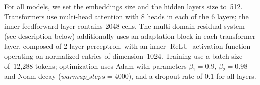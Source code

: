 \documentclass[11pt,a4paper]{article}
\newcommand{\fyDone}[1]{\done[FY]\Todo[FY:]{\textcolor{orange}{#1}}}
\begin{document}
For all models, we set the embeddings size and the hidden layers size to~512. Transformers use multi-head attention with 8 heads in each of the 6 layers; the inner feedforward layer contains 2048 cells. The multi-domain residual system (see description below) additionally uses an adaptation block in each transformer layer, composed of 2-layer perceptron, with an inner $\operatorname{ReLU}$ activation function operating on normalized entries of dimension~1024. 
Training use a batch size of~12,288 tokens; optimization uses Adam with parameters $\beta_1=0.9$, $\beta_2= 0.98$ and Noam decay ($warmup\_steps=4000$), and a dropout rate of $0.1$ for all layers.\fyDone{Describe the block adaptation layer - voir slides} 
\end{document}
